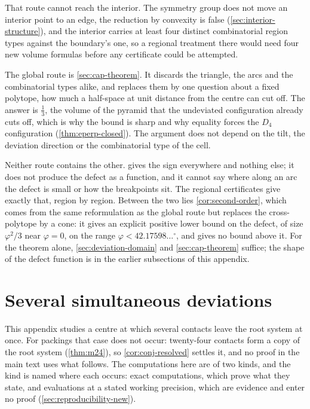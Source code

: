 \documentclass[11pt,reqno]{amsart}
\renewcommand{\_}{\origunderscore\allowbreak}
\numberwithin{equation}{section}
\theoremstyle{plain}
\theoremstyle{definition}
\theoremstyle{remark}
\newcommand{\tilt}{\varphi}                  %
\begin{document}
That route cannot reach the interior. The symmetry group does not move
an interior point to an edge, the reduction by convexity is false
(\cref{sec:interior-structure}), and the interior carries at least four
distinct combinatorial region types against the boundary's one, so a
regional treatment there would need four new volume formulas before any
certificate could be attempted.

The global route is \cref{sec:cap-theorem}. It discards the triangle,
the arcs and the combinatorial types alike, and replaces them by one
question about a fixed polytope, how much a half-space at unit distance
from the centre can cut off. The answer is $\tfrac13$, the volume of the
pyramid that the undeviated configuration already cuts off, which is why
the bound is sharp and why equality forces the $D_4$ configuration
(\cref{thm:eperp-closed}). The argument does not depend on the tilt, the
deviation direction or the combinatorial type of the cell.

Neither route contains the other. 
gives the sign everywhere and nothing else; it does not produce the
defect as a function, and it cannot say where along an arc the defect is
small or how the breakpoints sit. The regional certificates give exactly
that, region by region. Between the two lies
\cref{cor:second-order}, which comes from the same reformulation as the
global route but replaces the cross-polytope by a cone: it gives an
explicit positive lower bound on the defect, of size $\tilt^2/3$ near
$\tilt=0$, on the range $\tilt<42.17598\ldots^\circ$, and gives no
bound above it. For the theorem alone, \cref{sec:deviation-domain} and
\cref{sec:cap-theorem} suffice; the shape of the defect function is in
the earlier subsections of this appendix.

\section{Several simultaneous deviations}\label{app:several-deviations}

This appendix studies a centre at which several contacts leave the root
system at once. For packings that case does not occur: twenty-four
contacts form a copy of the root system (\cref{thm:m24}), so
\cref{cor:conj-resolved} settles it, and no proof in the main text uses
what follows. The computations here are of two kinds, and the kind is
named where each occurs: exact computations, which prove what they
state, and evaluations at a stated working precision, which are
evidence and enter no proof (\cref{sec:reproducibility-new}).
\end{document}
